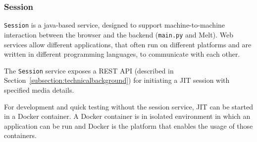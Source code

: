 \documentclass[../MasterThesis.tex]{subfiles}
\begin{document}

\subsubsection{Session}

\texttt{Session} is a java-based service, designed to support machine-to-machine interaction between the browser and the backend (\texttt{main.py} and Melt). Web services allow different applications, that often run on different platforms and are written in different programming languages, to communicate with each other.~\cite{webservice}

The \texttt{Session} service exposes a REST API (described in Section~\ref{subsection:technicalbackground}) for initiating a JIT session with specified media details. 






%
%

For development and quick testing without the session service, JIT can be started in a Docker container. A Docker container is in isolated environment in which an application can be run and Docker is the platform that enables the usage of those containers.~\cite{docker}
\end{document}
